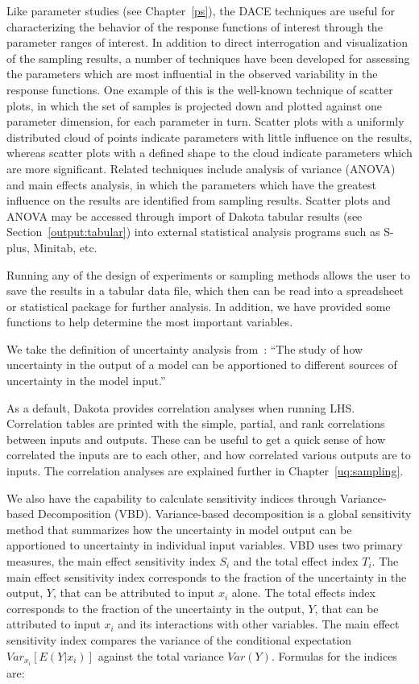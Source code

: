 Like parameter studies (see Chapter~\ref{ps}), the DACE techniques are
useful for characterizing the behavior of the response functions of
interest through the parameter ranges of interest. In addition to
direct interrogation and visualization of the sampling results, a
number of techniques have been developed for assessing the parameters
which are most influential in the observed variability in the response
functions. One example of this is the well-known technique of scatter
plots, in which the set of samples is projected down and plotted
against one parameter dimension, for each parameter in turn. Scatter
plots with a uniformly distributed cloud of points indicate parameters
with little influence on the results, whereas scatter plots with a
defined shape to the cloud indicate parameters which are more
significant. Related techniques include analysis of variance
(ANOVA)~\cite{Mye95} and main effects analysis, in which the parameters
which have the greatest influence on the results are identified from
sampling results. Scatter plots and ANOVA may be accessed through
import of Dakota tabular results (see Section~\ref{output:tabular})
into external statistical analysis programs such as S-plus, Minitab,
etc.

Running any of the design of experiments or sampling methods allows
the user to save the results in a tabular data file, which then can be
read into a spreadsheet or statistical package for further analysis.
In addition, we have provided some functions to help determine the
most important variables.

We take the definition of uncertainty analysis from~\cite{Sal04}: 
``The study of how uncertainty in the output of a model can be 
apportioned to different sources of uncertainty in the model input.''

As a default, Dakota provides correlation analyses when running LHS.
Correlation tables are printed with the simple, partial, and rank
correlations between inputs and outputs. These can be useful to get a
quick sense of how correlated the inputs are to each other, and how
correlated various outputs are to inputs. The correlation analyses are
explained further in Chapter~\ref{uq:sampling}.

We also have the capability to calculate sensitivity indices through
Variance-based Decomposition (VBD). Variance-based decomposition 
is a global sensitivity method that summarizes how the uncertainty 
in model output can be apportioned to uncertainty in individual 
input variables.  VBD uses two primary measures, the main effect 
sensitivity index $S_{i}$ and the total effect index $T_{i}$.  The 
main effect sensitivity 
index corresponds to the fraction of the uncertainty in the output, $Y$, 
that can be attributed to input $x_{i}$ alone.  The total effects index 
corresponds to the fraction of the uncertainty in 
the output, $Y$, that can be attributed to input $x_{i}$ and its 
interactions with other variables. The main effect sensitivity index
compares the variance of the conditional expectation
$Var_{x_{i}}[E(Y|x_{i})]$ against the total variance $Var(Y)$.
Formulas for the indices are: 

